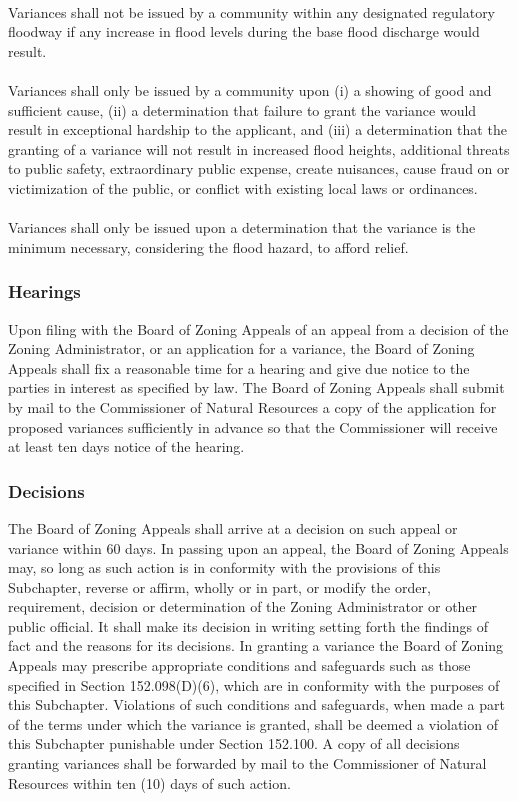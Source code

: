 \paragraph{}
Variances shall not be issued by a community within any designated regulatory floodway if any increase in flood levels during the base flood discharge would result.
\paragraph{}
Variances shall only be issued by a community upon (i) a showing of good and sufficient cause, (ii) a determination that failure to grant the variance would result in exceptional hardship to the applicant, and (iii) a determination that the granting of a variance will not result in increased flood heights, additional threats to public safety, extraordinary public expense, create nuisances, cause fraud on or victimization of the public, or conflict with existing local laws or ordinances.
\paragraph{}
Variances shall only be issued upon a determination that the variance is the minimum necessary, considering the flood hazard, to afford relief.
\subsubsection{Hearings}
Upon filing with the Board of Zoning Appeals of an appeal from a decision of the Zoning Administrator, or an application for a variance, the Board of Zoning Appeals shall fix a reasonable time for a hearing and give due notice to the parties in interest as specified by law. The Board of Zoning Appeals shall submit by mail to the Commissioner of Natural Resources a copy of the application for proposed variances sufficiently in advance so that the Commissioner will receive at least ten days notice of the hearing.
\subsubsection{Decisions}
The Board of Zoning Appeals shall arrive at a decision on such appeal or variance within 60 days. In passing upon an appeal, the Board of Zoning Appeals may, so long as such action is in conformity with the provisions of this Subchapter, reverse or affirm, wholly or in part, or modify the order, requirement, decision or determination of the Zoning Administrator or other public official. It shall make its decision in writing setting forth the findings of fact and the reasons for its decisions. In granting a variance the Board of Zoning Appeals may prescribe appropriate conditions and safeguards such as those specified in Section 152.098(D)(6), which are in conformity with the purposes of this Subchapter. Violations of such conditions and safeguards, when made a part of the terms under which the variance is granted, shall be deemed a violation of this Subchapter punishable under Section 152.100. A copy of all decisions granting variances shall be forwarded by mail to the Commissioner of Natural Resources within ten (10) days of such action.
